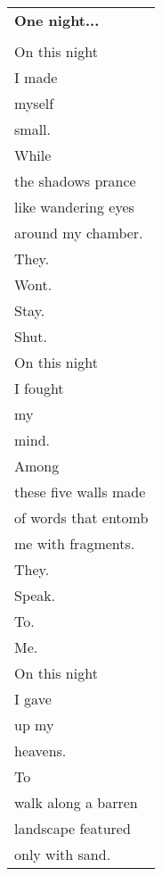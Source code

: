 \documentclass{article}
\begin{document}
\newcommand{\hh}{\hspace{2ex}}
\begin{center}
\begin{tabular}{l}
\textbf{One night...} \\
\\
On this night \\
\hh{}I made \\
\hh{}myself \\
\hh{}small. \\
While \\
the shadows prance \\
like wandering eyes \\
around my chamber. \\
They. \\
\hh{}Wont. \\
\hh{}\hh{}Stay. \\
\hh{}\hh{}\hh{}Shut. \\
On this night \\
\hh{}I fought \\
\hh{}my \\
\hh{}mind. \\
Among \\
these five walls made \\
of words that entomb \\
me with fragments. \\
They. \\
\hh{}Speak. \\
\hh{}\hh{}To. \\
\hh{}\hh{}\hh{}Me. \\
%
On this night \\
\hh{}I gave \\
\hh{}up my \\
\hh{}heavens. \\
To \\
walk along a barren \\
landscape featured \\
only with sand. \\

\end{tabular}
\end{center}
\end{document}
